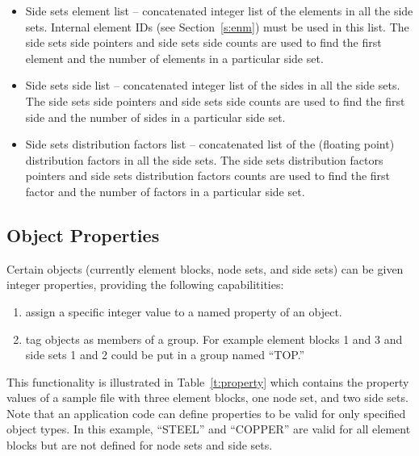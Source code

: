 \begin{itemize}
 \item {Side sets element list -- concatenated integer list of the
 elements in all the side sets.} {Internal element IDs (see
 Section~\ref{s:enm}) must be used in this list.} {The side sets side
 pointers and side sets side counts are used to find the first element
 and the number of elements in a particular side set.}

 \item {Side sets side list -- concatenated integer list of the sides
 in all the side sets. The side sets side pointers and side sets side
 counts are used to find the first side and the number of sides in a
 particular side set.}

 \item {Side sets distribution factors list -- concatenated list of
 the (floating point) distribution factors in all the side sets. The
 side sets distribution factors pointers and side sets distribution
 factors counts are used to find the first factor and the number of
 factors in a particular side set.}
\end{itemize}



\subsection{Object Properties}

Certain \exo{} objects (currently element blocks, node 
sets, and side sets) can be given integer properties, providing 
the following capabilitities:
\begin{enumerate}
\item assign a specific integer value to a named property of 
an object.

\item tag objects as members of a group. For example element 
blocks 1 and 3 and side sets 1 and 2 could be put in a group 
named ``TOP.''
\end{enumerate}

This functionality is illustrated in Table~\ref{t:property} which
contains the property values of a sample
\exo{} file with three element blocks, one node set, and two 
side sets. Note that an application code can define properties 
to be valid for only specified object types. In this example, 
``STEEL'' and ``COPPER'' are valid for all element blocks but are 
not defined for node sets and side sets. 

